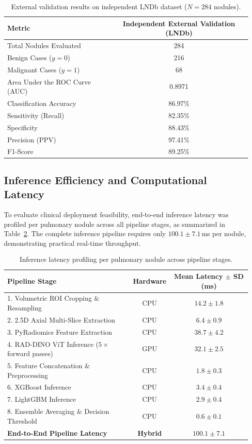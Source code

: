 \documentclass{iopjournal}
\begin{document}
\begin{table}[h]
\centering
\caption{External validation results on independent LNDb dataset ($N=284$ nodules).}\label{tab:external_lndb}
\begin{tabular}{lc}
\toprule
\textbf{Metric} & \textbf{Independent External Validation (LNDb)} \\
\midrule
Total Nodules Evaluated & 284 \\
Benign Cases ($y = 0$) & 216 \\
Malignant Cases ($y = 1$) & 68 \\
Area Under the ROC Curve (AUC) & 0.8971 \\
Classification Accuracy & 86.97\% \\
Sensitivity (Recall) & 82.35\% \\
Specificity & 88.43\% \\
Precision (PPV) & 97.41\% \\
F1-Score & 89.25\% \\
\bottomrule
\end{tabular}
\end{table}

\subsection{Inference Efficiency and Computational Latency}

To evaluate clinical deployment feasibility, end-to-end inference latency was
profiled per pulmonary nodule across all pipeline stages, as summarized in
Table~\ref{tab:timing}. The complete inference pipeline requires only
$100.1 \pm 7.1$\,ms per nodule, demonstrating practical real-time throughput.

\begin{table}[h]
\centering
\caption{Inference latency profiling per pulmonary nodule across pipeline stages.}\label{tab:timing}
\begin{tabular}{lcc}
\toprule
\textbf{Pipeline Stage} & \textbf{Hardware} & \textbf{Mean Latency $\pm$ SD (ms)} \\
\midrule
1. Volumetric ROI Cropping \& Resampling & CPU & $14.2 \pm 1.8$ \\
2. 2.5D Axial Multi-Slice Extraction & CPU & $6.4 \pm 0.9$ \\
3. PyRadiomics Feature Extraction & CPU & $38.7 \pm 4.2$ \\
4. RAD-DINO ViT Inference ($5 \times$ forward passes) & GPU & $32.1 \pm 2.5$ \\
5. Feature Concatenation \& Preprocessing & CPU & $1.8 \pm 0.3$ \\
6. XGBoost Inference & CPU & $3.4 \pm 0.4$ \\
7. LightGBM Inference & CPU & $2.9 \pm 0.4$ \\
8. Ensemble Averaging \& Decision Threshold & CPU & $0.6 \pm 0.1$ \\
\midrule
\textbf{End-to-End Pipeline Latency} & \textbf{Hybrid} & $\mathbf{100.1 \pm 7.1}$ \\
\bottomrule
\end{tabular}
\end{table}
\end{document}
